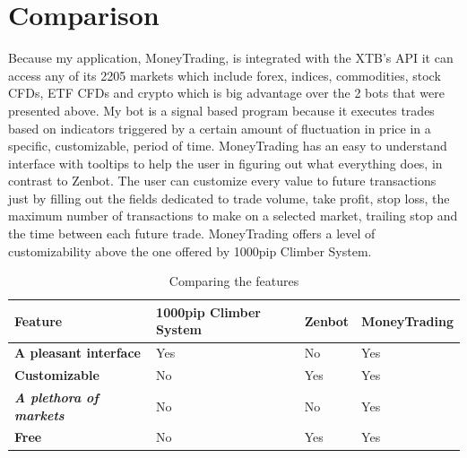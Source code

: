 \documentclass[12pt,a4paper]{report}
\begin{document}
\section{Comparison}
Because my application, MoneyTrading, is integrated with the XTB's API it can access any of its 2205 markets which include forex, indices, commodities, stock CFDs, ETF CFDs and crypto which is big advantage over the 2 bots that were presented above. My bot is a signal based program because it executes trades based on indicators triggered by a certain amount of fluctuation in price in a specific, customizable, period of time. MoneyTrading has an easy to understand interface with tooltips to help the user in figuring out what everything does, in contrast to Zenbot. The user can customize every value to future transactions just by filling out the fields dedicated to trade volume, take profit, stop loss, the maximum number of transactions to make on a selected market, trailing stop and the time between each future trade. MoneyTrading offers a level of customizability above the one offered by 1000pip Climber System.
\break
\renewcommand{\arraystretch}{1.5}
\begin{table}[th]\small\linespread{1}
	\begin{tabular}{l >{\raggedright\arraybackslash}p{3.5cm} >{\raggedright\arraybackslash}p{3.5cm} >{\raggedright\arraybackslash}p{3.5cm}}
		\textbf{Feature} & \textbf{1000pip Climber System} & \textbf{Zenbot} &\textbf{MoneyTrading} \\ [0.5cm]\hline
		\textbf{A pleasant interface} & Yes & No & Yes \\[0.5cm]\hline
		\textbf{Customizable} & No & Yes & Yes \\ [0.5cm]\hline
		\textbf{\textit{A plethora of markets}} & No & No & Yes \\ [0.5cm]\hline
		\textbf{Free} & No & Yes & Yes\\ [0.5cm]\hline
	\end{tabular}
	\caption{Comparing the features}
	\label{tab:comparsion}
\end{table} 
\end{document}
